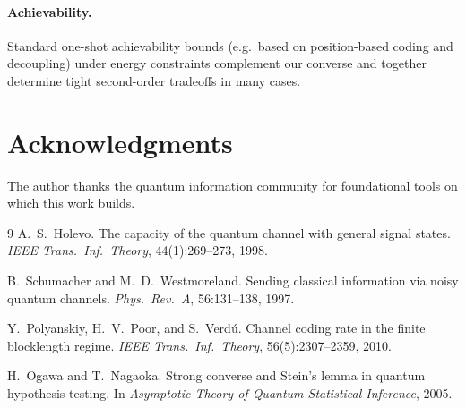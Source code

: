 \documentclass[11pt]{article}
\theoremstyle{definition}
\begin{document}
\paragraph{Achievability.}
Standard one-shot achievability bounds (e.g.\ based on position-based coding and decoupling) under energy constraints complement our converse and together determine tight second-order tradeoffs in many cases.

\section*{Acknowledgments}
The author thanks the quantum information community for foundational tools on which this work builds.

\begin{thebibliography}{9}
A.~S.~Holevo.
\newblock The capacity of the quantum channel with general signal states.
\newblock \emph{IEEE Trans.\ Inf.\ Theory}, 44(1):269--273, 1998.

B.~Schumacher and M.~D.~Westmoreland.
\newblock Sending classical information via noisy quantum channels.
\newblock \emph{Phys.\ Rev.\ A}, 56:131--138, 1997.

Y.~Polyanskiy, H.~V.~Poor, and S.~Verd\'u.
\newblock Channel coding rate in the finite blocklength regime.
\newblock \emph{IEEE Trans.\ Inf.\ Theory}, 56(5):2307--2359, 2010.

H.~Ogawa and T.~Nagaoka.
\newblock Strong converse and Stein's lemma in quantum hypothesis testing.
\newblock In \emph{Asymptotic Theory of Quantum Statistical Inference}, 2005.
\end{thebibliography}
\end{document}
